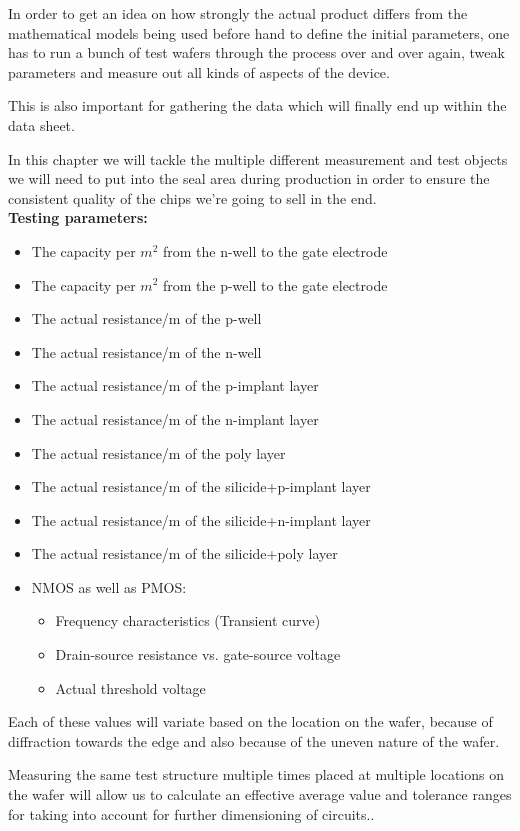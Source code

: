 In order to get an idea on how strongly the actual product differs from the mathematical models being used before hand to define the initial parameters, one has to run a bunch of test wafers through the process over and over again, tweak parameters and measure out all kinds of aspects of the device.

This is also important for gathering the data which will finally end up within the data sheet.

In this chapter we will tackle the multiple different measurement and test objects we will need to put into the seal area during production in order to ensure the consistent quality of the chips we're going to sell in the end.\\

\textbf{Testing parameters:}
\begin{itemize}
	\item The capacity per $m^2$ from the n-well to the gate electrode
	\item The capacity per $m^2$ from  the p-well to the gate electrode
	\item The actual resistance/m of the p-well
	\item The actual resistance/m of the n-well
	\item The actual resistance/m of the p-implant layer
	\item The actual resistance/m of the n-implant layer
	\item The actual resistance/m of the poly layer
	\item The actual resistance/m of the silicide+p-implant layer
	\item The actual resistance/m of the silicide+n-implant layer
	\item The actual resistance/m of the silicide+poly layer
	\item NMOS as well as PMOS:
	\begin{itemize}
		\item Frequency characteristics (Transient curve)
		\item Drain-source resistance vs. gate-source voltage
		\item Actual threshold voltage
	\end{itemize}
\end{itemize}

Each of these values will variate based on the location on the wafer, because of diffraction towards the edge and also because of the uneven nature of the wafer.

Measuring the same test structure multiple times placed at multiple locations on the wafer will allow us to calculate an effective average value and tolerance ranges for taking into account for further dimensioning of circuits..